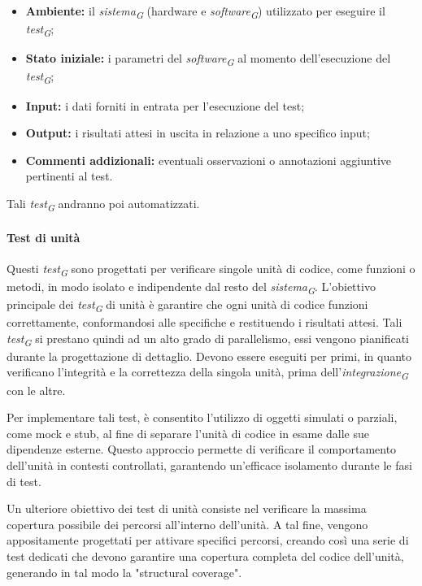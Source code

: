 \begin{itemize}
    \item \textbf{Ambiente:} 
        il \textit{sistema}\textsubscript{\textit{G}} (hardware e \textit{software}\textsubscript{\textit{G}}) utilizzato per eseguire il \textit{test}\textsubscript{\textit{G}};
    \item \textbf{Stato iniziale:} 
        i parametri del \textit{software}\textsubscript{\textit{G}} al momento dell'esecuzione del \textit{test}\textsubscript{\textit{G}};
    \item \textbf{Input:} 
        i dati forniti in entrata per l'esecuzione del test;
    \item \textbf{Output:} 
        i risultati attesi in uscita in relazione a uno specifico input;
    \item \textbf{Commenti addizionali:} 
        eventuali osservazioni o annotazioni aggiuntive pertinenti al test.
\end{itemize}
Tali \textit{test}\textsubscript{\textit{G}} andranno poi automatizzati. 

\paragraph{Test di unità}
Questi \textit{test}\textsubscript{\textit{G}} sono progettati per verificare singole unità di codice, come funzioni o metodi, in modo isolato e indipendente dal resto del \textit{sistema}\textsubscript{\textit{G}}. L'obiettivo principale dei \textit{test}\textsubscript{\textit{G}} di unità è garantire che ogni unità di codice funzioni correttamente, conformandosi alle specifiche e restituendo i risultati attesi.
Tali \textit{test}\textsubscript{\textit{G}} si prestano quindi ad un alto grado di parallelismo, essi vengono pianificati durante la progettazione di dettaglio.
Devono essere eseguiti per primi, in quanto verificano l’integrità e la correttezza della singola unità, prima dell’\textit{integrazione}\textsubscript{\textit{G}} con le altre. 

Per implementare tali test, è consentito l'utilizzo di oggetti simulati o parziali, come mock e stub, al fine di separare l'unità di codice in esame dalle sue dipendenze esterne. Questo approccio permette di verificare il comportamento dell'unità in contesti controllati, garantendo un'efficace isolamento durante le fasi di test.

Un ulteriore obiettivo dei test di unità consiste nel verificare la massima copertura possibile dei percorsi all'interno dell'unità. A tal fine, vengono appositamente progettati per attivare specifici percorsi, creando così una serie di test dedicati che devono garantire una copertura completa del codice dell'unità, generando in tal modo la "structural coverage".

